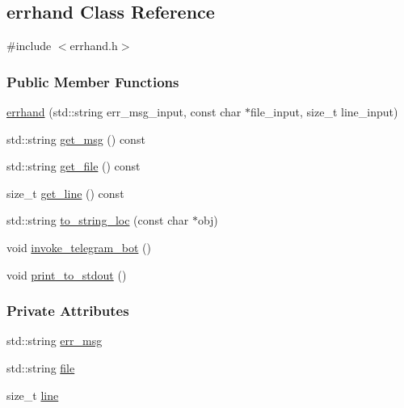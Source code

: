 \hypertarget{classerrhand}{}\subsection{errhand Class Reference}
\label{classerrhand}


{\ttfamily \#include $<$errhand.\+h$>$}

\subsubsection*{Public Member Functions}
\begin{DoxyCompactItemize}
\item 
\mbox{\hyperlink{classerrhand_a69afd61e0ebf5ee9d35f297dc2d5c086}{errhand}} (std\+::string err\+\_\+msg\+\_\+input, const char $\ast$file\+\_\+input, size\+\_\+t line\+\_\+input)
\item 
std\+::string \mbox{\hyperlink{classerrhand_a524dfc6821f703329d8801dd3298f33f}{get\+\_\+msg}} () const
\item 
std\+::string \mbox{\hyperlink{classerrhand_a1556ee8d0aaefeea3bbab73f7ae50914}{get\+\_\+file}} () const
\item 
size\+\_\+t \mbox{\hyperlink{classerrhand_a258f97d84476b21efc38827cda3e5889}{get\+\_\+line}} () const
\item 
std\+::string \mbox{\hyperlink{classerrhand_a930df1c197154853159683cb2ad55369}{to\+\_\+string\+\_\+loc}} (const char $\ast$obj)
\item 
void \mbox{\hyperlink{classerrhand_adbc86e81b391a68d2bf9a13529c977d3}{invoke\+\_\+telegram\+\_\+bot}} ()
\item 
void \mbox{\hyperlink{classerrhand_a5b4d8a74f1d0c6842526dc8b54e38dc2}{print\+\_\+to\+\_\+stdout}} ()
\end{DoxyCompactItemize}
\subsubsection*{Private Attributes}
\begin{DoxyCompactItemize}
\item 
std\+::string \mbox{\hyperlink{classerrhand_a2baa975c76a80afce9c97575c549058c}{err\+\_\+msg}}
\item 
std\+::string \mbox{\hyperlink{classerrhand_aed73d7a312fae4b4387d8d2487277a74}{file}}
\item 
size\+\_\+t \mbox{\hyperlink{classerrhand_a3ddc204c758b97e7d1550019e4513f3b}{line}}
\end{DoxyCompactItemize}


